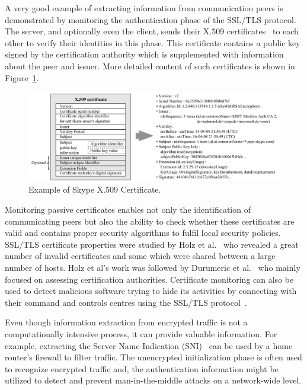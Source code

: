 A very good example of extracting information from communication peers is demonstrated by monitoring the authentication phase of the SSL/TLS protocol. The server, and optionally even the client, sends their X.509 certificates~\cite{rfc5280} to each other to verify their identities in this phase. This certificate contains a public key signed by the certification authority which is supplemented with information about the peer and issuer. More detailed content of such certificates is shown in Figure~\ref{fig:certificates-contents}.

\begin{figure}[!ht]
	\begin{center}
		\includegraphics[width=0.9\linewidth]{figures/certificate}
		\caption{Example of Skype X.509 Certificate.}
		\label{fig:certificates-contents}
	\end{center}
\end{figure}

Monitoring passive certificates enables not only the identification of communicating peers but also the ability to check whether these certificates are valid and contains proper security algorithms to fulfil local security policies. SSL/TLS certificate properties were studied by Holz et al.~\cite{Holz-2011-SSL} who revealed a great number of invalid certificates and some which were shared between a large number of hosts. Holz et al's work was followed by Durumeric et al.~\cite{Durumeric-2013-Analysis} who mainly focused on assessing certification authorities. Certificate monitoring can also be used to detect malicious software trying to hide its activities by connecting with their command and controls centres using the SSL/TLS protocol~\cite{ssl-certificates-blacklist}.

Even though information extraction from encrypted traffic is not a computationally intensive process, it can provide valuable information. For example, extracting the Server Name Indication (SNI)~\cite{rfc4366} can be used by a home router's firewall to filter traffic. The unencrypted initialization phase is often used to recognize encrypted traffic and, the authentication information might be utilized to detect and prevent man-in-the-middle attacks on a network-wide level.

